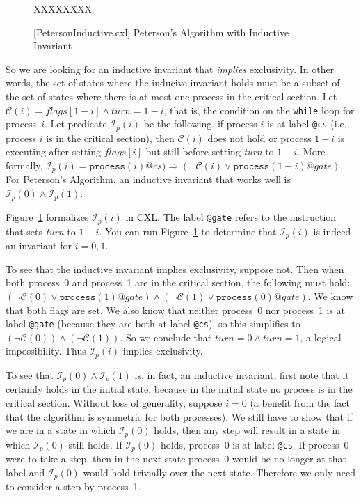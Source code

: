 \documentclass{report}
\newcommand{\cxlsource}[1]{
\begin{tabbing}
XX\=XXX\=XXX\kill
    
\end{tabbing}
}
\newenvironment{code}{
\tcolorbox
}{
\endtcolorbox
}
\begin{document}
\begin{figure}
\begin{code}
\cxlsource{PetersonInductive}
\end{code}
\caption{[PetersonInductive.cxl] Peterson's Algorithm with Inductive Invariant}
\label{fig:petersonproof}
\end{figure}

So we are looking for an inductive invariant that \emph{implies} exclusivity.
In other words, the set of states where the inducive invariant holds
must be a subset of the set of states where there is at most one process in
the critical section.
Let $\mathcal{C}(i) = \mathit{flags}[1 - i] \land
\mathit{turn} = 1 - i$, that is, the condition on the \texttt{while} loop
for process~$i$.
Let predicate $\mathcal{I}_p(i)$ be the following.
if process $i$ is at label \texttt{@cs} (i.e., process $i$ is in the critical section),
then $\mathcal{C}(i)$ does not hold or process $1-i$ is executing after setting
$\mathit{flags}[i]$ but still before setting \textit{turn} to $1-i$.
More formally, $\mathcal{I}_p(i) = \mathtt{process}(i)@cs) \Rightarrow (\lnot \mathcal{C}(i) \lor \mathtt{process}(1-i)@gate)$.
For Peterson's Algorithm, an inductive invariant that works well is
$\mathcal{I}_p(0) \land \mathcal{I}_p(1)$.

Figure~\ref{fig:petersonproof} formalizes $\mathcal{I}_p(i)$ in CXL.
The label \texttt{@gate} refers to the instruction that sets \textit{turn} to $1-i$.
You can run Figure~\ref{fig:petersonproof} to determine
that $\mathcal{I}_p(i)$ is indeed an invariant for $i = 0, 1$.

To see that the inductive invariant implies exclusivity, suppose not.  Then
when both process~0 and process~1 are in the critical section, the
following must hold:
$(\lnot \mathcal{C}(0) \lor \mathtt{process}(1)@gate) \land
 (\lnot \mathcal{C}(1) \lor \mathtt{process}(0)@gate)$.
We know that both flags are set.
We also know that neither process~0 nor process~1 is at label \texttt{@gate}
(because they are both at label \texttt{@cs}),
so this simplifies to $(\lnot \mathcal{C}(0)) \land (\lnot \mathcal{C}(1))$.
So we conclude that $\mathit{turn} = 0 \land \mathit{turn} = 1$, a
logical impossibility.  Thus $\mathcal{I}_p(i)$ implies exclusivity.

To see that $\mathcal{I}_p(0) \land \mathcal{I}_p(1)$ is, in fact, an inductive invariant, first note that
it certainly holds in the initial state, because in the initial state no process
is in the critical section.
Without loss of generality, suppose $i=0$ (a benefit from the fact that the algorithm is
symmetric for both processes).  We still have to show that if we are in a state
in which $\mathcal{I}_p(0)$ holds, then any step will result in a state in which
$\mathcal{I}_p(0)$ still holds.
If $\mathcal{I}_p(0)$ holds, process~0 is at label \texttt{@cs}.  If process~0
were to take a step, then in the next state process~0 would be no longer
at that label and $\mathcal{I}_p(0)$ would hold trivially over the next state.
Therefore we only need to consider a step by process~1.
\end{document}
